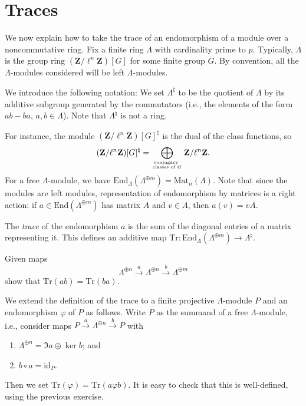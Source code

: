 \section{Traces}
\label{section-traces}

\noindent
We now explain how to take the trace of an endomorphism of a module over a
noncommutative ring. Fix a finite ring $\Lambda$ with cardinality prime to $p$.
Typically, $\Lambda$ is the group ring $(\mathbf{Z}/\ell^n\mathbf{Z})[G]$ for
some finite group $G$. By convention, all the $\Lambda$-modules considered will
be left $\Lambda$-modules.

\medskip\noindent
We introduce the following notation:
We set $\Lambda^\natural$ to be the quotient of $\Lambda$ by its additive
subgroup generated by the commutators (i.e., the elements of the form
$ab-ba$, $a, b \in \Lambda$). Note that $\Lambda^\natural$ is not a ring.

\medskip\noindent
For instance, the module $(\mathbf{Z}/\ell^n\mathbf{Z})[G]^\natural$ is the
dual of the class functions, so
$$
(\mathbf{Z}/\ell^n\mathbf{Z})[G]^\natural = \bigoplus_{\text{conjugacy } \atop
\text{classes of $G$}} \mathbf{Z}/\ell^n\mathbf{Z}.
$$
For a free $\Lambda$-module, we have $\text{End}_\Lambda(\Lambda^{\oplus m}) =
\text{Mat}_n(\Lambda)$. Note that since the modules are left modules,
representation of endomorphism by matrices is a right action: if $a \in
\text{End}(\Lambda^{\oplus m})$ has matrix $A$ and $v \in \Lambda$, then $a(v)
= v A$.

\begin{definition}
\label{definition-trace}
The {\it trace} of the endomorphism $a$ is the sum of the diagonal entries of
a matrix representing it. This defines an additive map $\text{Tr} :
\text{End}_\Lambda(\Lambda^{\oplus m}) \to \Lambda^\natural$.
\end{definition}

\begin{exercise}
\label{exercise-trace-is-trace}
Given maps
$$
\Lambda^{\oplus n} \xrightarrow{a}
\Lambda^{\oplus n} \xrightarrow{b}
\Lambda^{\oplus m}
$$
show that $\text{Tr}(ab) = \text{Tr}(ba)$.
\end{exercise}

\noindent
We extend the definition of the trace to a finite projective $\Lambda$-module
$P$ and an endomorphism $\varphi$ of $P$ as follows. Write $P$ as the summand
of a free $\Lambda$-module, i.e., consider maps $P \xrightarrow{a}
\Lambda^{\oplus n} \xrightarrow{b} P$ with
\begin{enumerate}
\item
$\Lambda^{\oplus n} = \Im a \oplus \ker b$; and
\item
$b\circ a = \text{id}_P$.
\end{enumerate}
Then we set $\text{Tr}(\varphi) = \text{Tr}(a\varphi b)$. It is easy to check
that this is well-defined, using the previous exercise.









